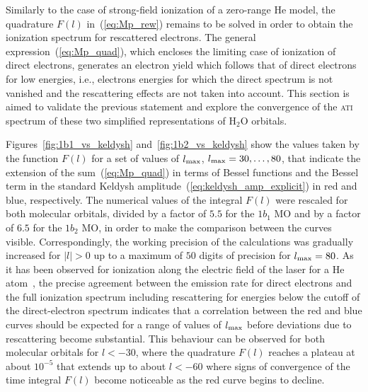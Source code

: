 Similarly to the case of strong-field ionization of a zero-range He
model, the quadrature $F(l)$ in~(\ref{eq:Mp_rew}) remains to be solved
in order to obtain the ionization spectrum for rescattered
electrons. The general expression~(\ref{eq:Mp_quad}), which encloses
the limiting case of ionization of direct electrons, generates an
electron yield which follows that of direct electrons for low
energies, i.e., electrons energies for which the direct spectrum is
not vanished and the rescattering effects are not taken into
account. This section is aimed to validate the previous statement and
explore the convergence of the \textsc{ati} spectrum of these two
simplified representations of H$_{2}$O orbitals.

Figures~\ref{fig:1b1_vs_keldysh} and~\ref{fig:1b2_vs_keldysh} show the
values taken by the function $F(l)$ for a set of values of
$l_{\rm{max}}$, $l_{\rm{max}} = 30,\dots,80$, that indicate the
extension of the sum~(\ref{eq:Mp_quad}) in terms of Bessel functions
and the Bessel term in the standard Keldysh
amplitude~(\ref{eq:keldysh_amp_explicit}) in red and blue,
respectively. The numerical values of the integral $F(l)$ were
rescaled for both molecular orbitals, divided by a factor of $5.5$ for
the $1b_{1}$ MO and by a factor of $6.5$ for the $1b_{2}$ MO, in order
to make the comparison between the curves visible. Correspondingly,
the working precision of the calculations was gradually increased for
$|l| > 0$ up to a maximum of $50$ digits of precision for
$l_{\rm{max}} = 80$. As it has been observed for ionization along the
electric field of the laser for a He atom~\cite{Kopold_1997sfa}, the
precise agreement between the emission rate for direct electrons and
the full ionization spectrum including rescattering for energies below
the cutoff of the direct-electron spectrum indicates that a
correlation between the red and blue curves should be expected for a
range of values of $l_{\rm{max}}$ before deviations due to
rescattering become substantial. This behaviour can be observed for
both molecular orbitals for $l < -30$, where the quadrature $F(l)$
reaches a plateau at about $10^{-5}$ that extends up to about $l <
-60$ where signs of convergence of the time integral $F(l)$ become
noticeable as the red curve begins to decline.

